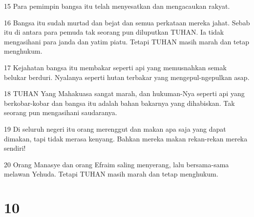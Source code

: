 \par 15 Para pemimpin bangsa itu telah menyesatkan dan mengacaukan rakyat.
\par 16 Bangsa itu sudah murtad dan bejat dan semua perkataan mereka jahat. Sebab itu di antara para pemuda tak seorang pun diluputkan TUHAN. Ia tidak mengasihani para janda dan yatim piatu. Tetapi TUHAN masih marah dan tetap menghukum.
\par 17 Kejahatan bangsa itu membakar seperti api yang memusnahkan semak belukar berduri. Nyalanya seperti hutan terbakar yang mengepul-ngepulkan asap.
\par 18 TUHAN Yang Mahakuasa sangat marah, dan hukuman-Nya seperti api yang berkobar-kobar dan bangsa itu adalah bahan bakarnya yang dihabiskan. Tak seorang pun mengasihani saudaranya.
\par 19 Di seluruh negeri itu orang merenggut dan makan apa saja yang dapat dimakan, tapi tidak merasa kenyang. Bahkan mereka makan rekan-rekan mereka sendiri!
\par 20 Orang Manasye dan orang Efraim saling menyerang, lalu bersama-sama melawan Yehuda. Tetapi TUHAN masih marah dan tetap menghukum.

\chapter{10}

